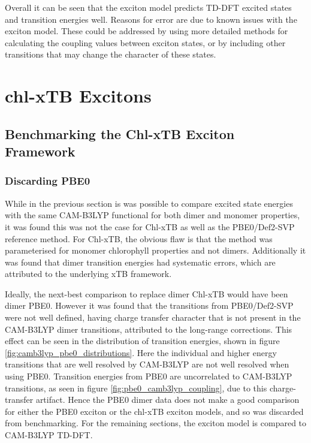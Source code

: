 Overall it can be seen that the exciton model predicts TD-DFT excited states and
transition energies well. Reasons for error are due to known issues with the exciton
model. These could be addressed by using more detailed methods for calculating the
coupling values between exciton states, or by including other transitions that may
change the character of these states.

\afterpartskip
\section{chl-xTB Excitons}
\label{sec:chl_xTB_excitons}

\subsection{Benchmarking the Chl-xTB Exciton Framework}
\label{subsec:pbe0_and_chl_xtb_dimer}

\subsubsection{Discarding PBE0}
\label{subsec:state_assign}

While in the previous section is was possible to compare excited state energies
with the same CAM-B3LYP functional for both dimer and monomer properties, it was
found this was not the case for Chl-xTB as well as the PBE0/Def2-SVP reference method.
For Chl-xTB, the obvious flaw is that the method was parameterised for monomer chlorophyll
properties and not dimers. Additionally it was found that dimer transition energies
had systematic errors, which are attributed to the underlying xTB framework.

Ideally, the next-best comparison to replace dimer Chl-xTB would have been dimer
PBE0. However it was found that the transitions from PBE0/Def2-SVP were not well
defined, having charge transfer character that is not present in the CAM-B3LYP
dimer transitions, attributed to the long-range corrections. This effect can be seen
in the distribution of transition energies, shown in figure \ref{fig:camb3lyp_pbe0_distributions}. 
Here the individual \Qy and higher energy transitions that are well resolved by 
CAM-B3LYP are not well resolved when using PBE0. Transition energies from PBE0 are 
uncorrelated to CAM-B3LYP transitions, as seen in figure \ref{fig:pbe0_camb3lyp_coupling},
due to this charge-transfer artifact. Hence the PBE0 dimer data does not make a 
good comparison for either the PBE0 exciton or the chl-xTB exciton models, and so
was discarded from benchmarking. For the remaining sections, the exciton model is
compared to CAM-B3LYP TD-DFT.

